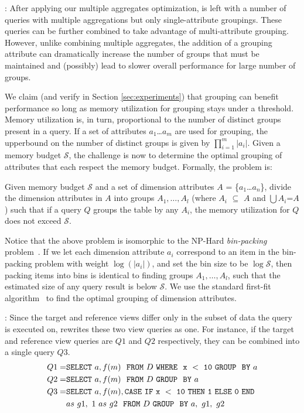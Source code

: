:
After applying our multiple aggregates optimization, \SeeDB is left with a number of 
queries with multiple aggregations but only single-attribute groupings.
These queries can be further combined to take advantage of multi-attribute grouping.
However, unlike combining multiple aggregates, the addition of a grouping attribute can 
dramatically increase the number of groups that must be maintained and (possibly)
lead to slower overall performance for large number of groups.

We claim (and verify in Section \ref{sec:experiments}) that grouping can benefit 
performance so long as memory utilization for grouping stays under a threshold. 
Memory utilization is, in turn, proportional to the number of distinct groups 
present in a query.
If a set of attributes $a_1$\ldots$a_m$ are used for grouping, the upperbound on the 
number of distinct groups is given by $\prod_{i=1}^m |a_i|$. 
Given a memory budget $\mathcal{S}$, the challenge is now to determine the optimal grouping
of attributes that each respect the memory budget. Formally, the problem is:
\vspace{-5pt}
\begin{problem}
Given memory budget $\mathcal{S}$ and a set of dimension attributes $A$ = \{$a_1$\ldots$a_n$\}, 
divide the dimension attributes in $A$ into groups $A_1, \ldots, A_l$ (where $A_i$ $\subseteq$ $A$ 
and $\bigcup A_i$=$A$) such that if a query $Q$ groups the table by any $A_i$, 
the memory utilization for $Q$ does not exceed $\mathcal{S}$.
\vspace{-5pt}
\end{problem}

Notice that the above problem is isomorphic to the NP-Hard {\em bin-packing} problem~\cite{garey}.
If we let each dimension attribute
$a_i$ correspond to an item in the bin-packing problem with weight $\log (|a_i|)$,
and set the bin size to be $\log \mathcal{S}$,
then packing items into bins is identical to finding groups $A_1, \ldots, A_l$,
such that the estimated size of any query result is below $\mathcal{S}$.
We use the standard first-fit algorithm~\cite{first-fit} to find the optimal
grouping of dimension attributes.


:
Since the target and reference views differ only in the subset of data
the query is executed on, \SeeDB rewrites these two view queries as
one. For instance, if the target and reference view queries are $Q1$ and $Q2$
respectively, they can be combined into a single query $Q3$.
\vspace{-5pt}
\begin{align*} 
Q1 = &{\tt SELECT \ } a, f(m) \ \ {\tt FROM} \  D\  {\tt WHERE \ \ x\ <\ 10\
GROUP \ \ BY} \ a \\
Q2 = &{\tt SELECT \ } a, f(m) \ \ {\tt FROM} \  D\  {\tt GROUP \ \ BY} \ a \\
Q3 = &{\tt SELECT \ } a, f(m), {\tt CASE\ IF\ x\ <\ 10\ THEN\ 1\ ELSE\ 0\
END}\\ 
&as\ g1,\ 1\ as\ g2 \ \ {\tt FROM} \ D\ {\tt GROUP \ \ BY} \ a,\ g1,\ g2
\end{align*}




